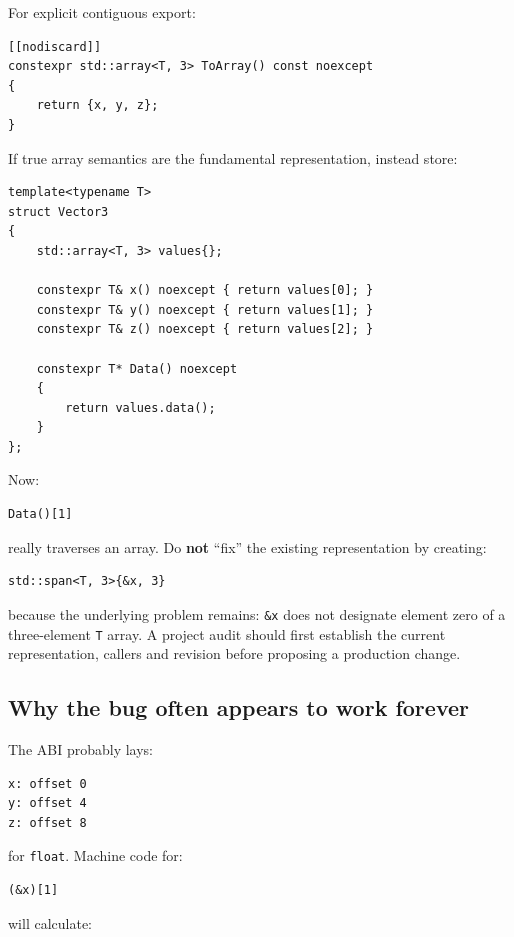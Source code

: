 For explicit contiguous export:

\begin{verbatim}
[[nodiscard]]
constexpr std::array<T, 3> ToArray() const noexcept
{
    return {x, y, z};
}
\end{verbatim}

If true array semantics are the fundamental representation, instead store:

\begin{verbatim}
template<typename T>
struct Vector3
{
    std::array<T, 3> values{};

    constexpr T& x() noexcept { return values[0]; }
    constexpr T& y() noexcept { return values[1]; }
    constexpr T& z() noexcept { return values[2]; }

    constexpr T* Data() noexcept
    {
        return values.data();
    }
};
\end{verbatim}

Now:

\begin{verbatim}
Data()[1]
\end{verbatim}

really traverses an array. Do \textbf{not} ``fix'' the existing representation by creating:

\begin{verbatim}
std::span<T, 3>{&x, 3}
\end{verbatim}

because the underlying problem remains: \texttt{\&x} does not designate element zero of a three-element \texttt{T} array. A project audit should first establish the current representation, callers and revision before proposing a production change.

\subsection{Why the bug often appears to work forever}\label{05-engine-i-ch003-why-the-bug-often-appears-to-work-forever}

The ABI probably lays:

\begin{verbatim}
x: offset 0
y: offset 4
z: offset 8
\end{verbatim}

for \texttt{float}. Machine code for:

\begin{verbatim}
(&x)[1]
\end{verbatim}

will calculate:

